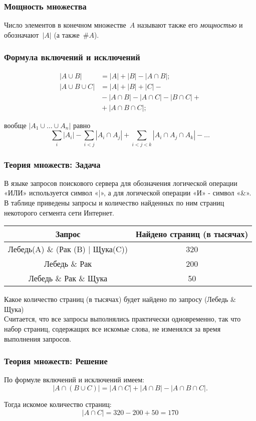 \begin{frame}
\frametitle{Мощность множества}

Число элементов в конечном
множестве~$A$ называют также его
\emph{мощностью}
и обозначают~$|A|$ (а также~$\#A$).

\end{frame}

\begin{frame}
\frametitle{Формула включений и исключений}

\begin{align*}
    |A\cup B|        & =|A|+|B|-|A\cap B|;\\
    |A\cup B \cup C| & =|A|+|B|+|C|-\\
                     &{}-|A\cap B|-|A\cap C|-|B\cap C|+\\
                     &{}+|A\cap B\cap C|;
\end{align*}

вообще $|A_1\cup\ldots\cup A_n|$ равно
        $$
      \sum_{i}|A_i| - \sum_{i<j}|A_i \cap A_j| +
      \sum_{i<j<k} |A_i \cap A_j \cap A_k| - \ldots
        $$


\end{frame}

\begin{frame}
\frametitle{Теория множеств: Задача}
В языке запросов поискового сервера для обозначения логической операции «ИЛИ» используется символ «|», а для логической операции «И» - символ «\&». В таблице приведены запросы и количество найденных по ним страниц некоторого сегмента сети Интернет.
\begin{tabular}{|c|c|}
\hline 
 Запрос &Найдено страниц (в тысячах) \tabularnewline
\hline 
Лебедь(A) \& (Рак (B) | Щука(C)) &  320 \tabularnewline
\hline 
Лебедь \& Рак & 200 \tabularnewline
\hline 
Лебедь \& Рак \& Щука & 50 \tabularnewline
\hline 
\end{tabular}

Какое количество страниц (в тысячах) будет найдено по запросу (Лебедь \& Щука)\\
Считается, что все запросы выполнялись практически одновременно, так что набор страниц, содержащих все искомые слова, не изменялся за время выполнения запросов.

\end{frame}

\begin{frame}
\frametitle{Теория множеств: Решение}
По формуле включений и исключений имеем:
 $$
|A \cap (B \cup C)|=|A\cap C| + |A \cap B| - |A \cap B \cap C|.
$$
 
Тогда искомое количество страниц:
$$
|A \cap C| = 320 - 200 + 50 = 170
$$
\end{frame}




